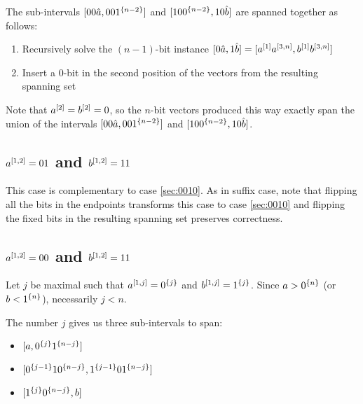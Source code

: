 The sub-intervals
$[00 \hat{a}, 00 1^{\{n-2\}}]$
and
$[10 0^{\{n-2\}}, 10 \hat{b}]$
are spanned together as follows:

\begin{enumerate}
\item Recursively solve the $(n-1)$-bit instance
$[0 \hat{a}, 1 \hat{b}]
= [a^{[1]} a^{[3, n]}, b^{[1]} b^{[3, n]}]$
\item Insert a $0$-bit in the second position
of the vectors from the resulting spanning set
\end{enumerate}

Note that $a^{[2]} = b^{[2]} = 0$,
so the $n$-bit vectors produced this way
exactly span the union of the intervals
$[00 \hat{a}, 00 1^{\{n-2\}}]$
and $[10 0^{\{n-2\}}, 10 \hat{b}]$.

\subsection{\texorpdfstring
{$a^{[1, 2]} = 01$ and $b^{[1, 2]} = 11$}
{ = 01 and  = 11}
}

This case is complementary to case \ref{sec:0010}.
As in suffix case,
note that flipping all the bits in the endpoints
transforms this case to case \ref{sec:0010}
and flipping the fixed bits in the resulting spanning set
preserves correctness.

\subsection{\texorpdfstring
{$a^{[1, 2]} = 00$ and $b^{[1, 2]} = 11$}
{ = 00 and  = 11}
}
\label{sec:1interval0011}

Let $j$ be maximal such that
$a^{[1, j]} = 0^{\{j\}}$ and
$b^{[1, j]} = 1^{\{j\}}$.
Since $a > 0^{\{n\}}$ (or $b < 1^{\{n\}}$),
necessarily $j < n$.

The number $j$ gives us three sub-intervals to span:

\begin{itemize}
\item $[a, 0^{\{j\}} 1^{\{n-j\}}]$
\item $[0^{\{j-1\}} 1 0^{\{n-j\}}, 1^{\{j-1\}} 0 1^{\{n-j\}}]$
\item $[1^{\{j\}} 0^{\{n-j\}}, b]$
\end{itemize}

